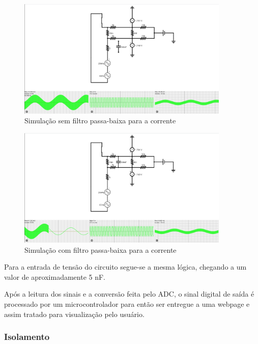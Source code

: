 \begin{figure}[htb!]
    \caption{Simulação sem filtro passa-baixa para a corrente}
    \label{fig:simco1}
    \includegraphics[width=0.9\textwidth]{figuras/sim-co-1.png}
    \fonte{}
\end{figure}

\begin{figure}[htb!]
    \caption{Simulação com filtro passa-baixa para a corrente}
    \label{fig:simco2}
    \includegraphics[width=0.9\textwidth]{figuras/sim-co-2.png}
    \fonte{}
\end{figure}

Para a entrada de tensão do circuito segue-se a mesma lógica, chegando a um valor de aproximadamente 5 nF.

Após a leitura dos sinais e a conversão feita pelo ADC, o sinal digital de saída é processado por um microcontrolador para então ser entregue a uma webpage e assim tratado para visualização pelo usuário. 

\subsubsection{Isolamento}\label{isolamento-metodologia}

